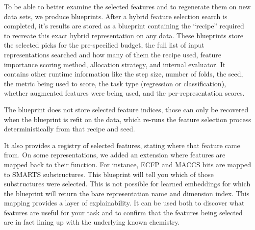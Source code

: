 
To be able to better examine the selected features and to regenerate them on new data sets, we produce blueprints. After a hybrid feature selection search is completed, it's results are stored as a blueprint containing the ``recipe'' required to recreate this exact hybrid representation on any data. These blueprints store the selected picks for the pre-specified budget,  the full list of input representations searched and how many of them the recipe used, feature importance scoring method, allocation strategy, and internal evaluator. It contains other runtime information like the step size, number of folds, the seed, the metric being used to score, the task type (regression or classification), whether augmented features were being used, and the per-representation scores.

The blueprint does not store selected feature indices, those can only be recovered when the blueprint is refit on the data, which re-runs the feature selection process deterministically from that recipe and seed.

It also provides a registry of selected features, stating where that feature came from. On some representations, we added an extension where features are mapped back to their function. For instance, ECFP and MACCS bits are mapped to SMARTS substructures. This blueprint will tell you which of those substructures were selected. This is not possible for learned embeddings for which the blueprint will return the bare representation name and dimension index. This mapping provides a layer of explainability. It can be used both to discover what features are useful for your task and to confirm that the features being selected are in fact lining up with the underlying known chemistry.

